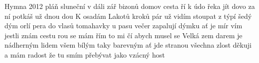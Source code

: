 \begin{TEXT}{Hymna 2012}
\SLOKA {} pláň\NL
sluneční v dáli zář\NL
bizonů domov   \NL
cesta ří k údo\NL
řeka jít dovo\NL
za ní potkáš už dnou dou 
\SLOKA K osadám\NL
Lakotů kroků pár\NL
už vidím stoupat z týpí šedý dým\NL
orlí pera do vlasů\NL
tomahavky u pasu\NL
večer zapalují dýmku ať je mír
\SLOKA* {}vím jestli znám cestu\NL
{}rou se mám \NL
{}řím to mi čí\NL
abych musel se 
\SLOKA Velká zem\NL
darem je nádherným\NL
lidem všem bílým taky barevným\NL
ať jde stranou všechna zlost\NL
děkuji a mám radost\NL
že tu smím přebývat jako vzácný host
\end{TEXT}
